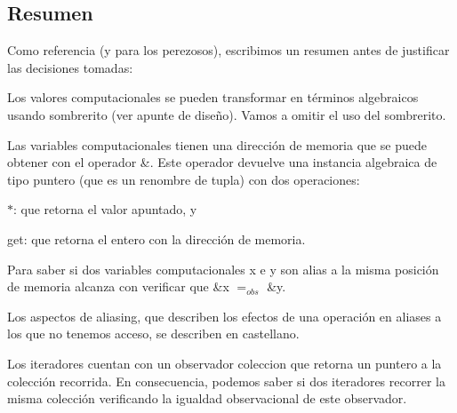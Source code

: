 \hypertarget{Aliasing_sec-Resumen}{}\subsection{Resumen}\label{Aliasing_sec-Resumen}
Como referencia (y para los perezosos), escribimos un resumen antes de justificar las decisiones tomadas\+:
\begin{DoxyItemize}
\item Los valores computacionales se pueden transformar en términos algebraicos usando sombrerito (ver apunte de diseño). Vamos a omitir el uso del sombrerito.
\item Las variables computacionales tienen una dirección de memoria que se puede obtener con el operador \&. Este operador devuelve una instancia algebraica de tipo puntero (que es un renombre de tupla) con dos operaciones\+:
\begin{DoxyEnumerate}
\item \textquotesingle{}$\ast$\textquotesingle{}\+: que retorna el valor apuntado, y
\item \textquotesingle{}get\textquotesingle{}\+: que retorna el entero con la dirección de memoria.
\end{DoxyEnumerate}
\item Para saber si dos variables computacionales {\ttfamily x} e {\ttfamily y} son alias a la misma posición de memoria alcanza con verificar que \&{\ttfamily x} $=_{obs}$ \&{\ttfamily y}.
\item Los aspectos de aliasing, que describen los efectos de una operación en aliases a los que no tenemos acceso, se describen en castellano.
\item Los iteradores cuentan con un observador {\ttfamily coleccion} que retorna un puntero a la colección recorrida. En consecuencia, podemos saber si dos iteradores recorrer la misma colección verificando la igualdad observacional de este observador.
\end{DoxyItemize}

